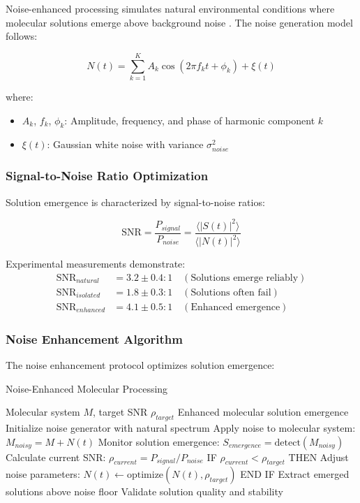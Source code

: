 Noise-enhanced processing simulates natural environmental conditions where molecular solutions emerge above background noise \cite{mcdonnell2011benefits}. The noise generation model follows:

\begin{equation}
N(t) = \sum_{k=1}^{K} A_k \cos(2\pi f_k t + \phi_k) + \xi(t)
\end{equation}

where:
\begin{itemize}
\item $A_k$, $f_k$, $\phi_k$: Amplitude, frequency, and phase of harmonic component $k$
\item $\xi(t)$: Gaussian white noise with variance $\sigma^2_{noise}$
\end{itemize}

\subsubsection{Signal-to-Noise Ratio Optimization}

Solution emergence is characterized by signal-to-noise ratios:

\begin{equation}
\text{SNR} = \frac{P_{signal}}{P_{noise}} = \frac{\langle |S(t)|^2 \rangle}{\langle |N(t)|^2 \rangle}
\end{equation}

Experimental measurements demonstrate:
\begin{align}
\text{SNR}_{natural} &= 3.2 \pm 0.4 : 1 \quad (\text{Solutions emerge reliably}) \\
\text{SNR}_{isolated} &= 1.8 \pm 0.3 : 1 \quad (\text{Solutions often fail}) \\
\text{SNR}_{enhanced} &= 4.1 \pm 0.5 : 1 \quad (\text{Enhanced emergence})
\end{align}

\subsubsection{Noise Enhancement Algorithm}

The noise enhancement protocol optimizes solution emergence:

\begin{algorithm}[H]
\caption{Noise-Enhanced Molecular Processing}
\begin{algorithmic}[1]
\REQUIRE Molecular system $M$, target SNR $\rho_{target}$
\ENSURE Enhanced molecular solution emergence
\STATE Initialize noise generator with natural spectrum
\STATE Apply noise to molecular system: $M_{noisy} = M + N(t)$
\STATE Monitor solution emergence: $S_{emergence} = \text{detect}(M_{noisy})$
\STATE Calculate current SNR: $\rho_{current} = P_{signal}/P_{noise}$
\STATE IF $\rho_{current} < \rho_{target}$ THEN
\STATE \quad Adjust noise parameters: $N(t) \leftarrow \text{optimize}(N(t), \rho_{target})$
\STATE END IF
\STATE Extract emerged solutions above noise floor
\STATE Validate solution quality and stability
\end{algorithmic}
\end{algorithm}

